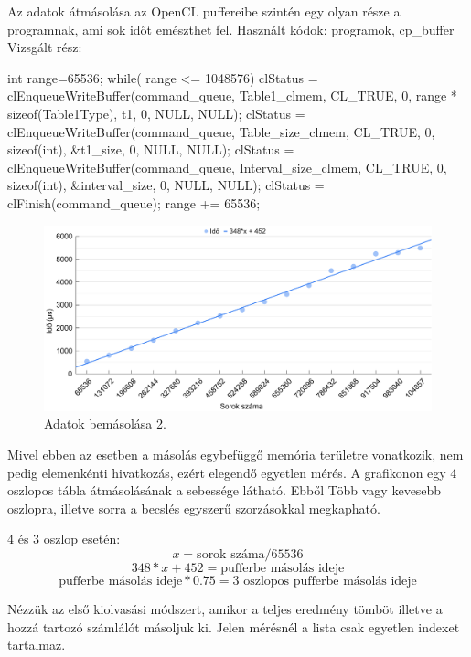 
Az adatok átmásolása az OpenCL puffereibe szintén egy olyan része a programnak, ami sok időt emészthet fel.
Használt kódok: programok, cp\_buffer
Vizsgált rész:

\begin{python}
int range=65536;
while( range <= 1048576){
 clStatus = clEnqueueWriteBuffer(command_queue, Table1_clmem,
  CL_TRUE, 0, range * sizeof(Table1Type), t1, 0, NULL, NULL);
 clStatus = clEnqueueWriteBuffer(command_queue, Table_size_clmem,
  CL_TRUE, 0, sizeof(int), &t1_size, 0, NULL, NULL);
 clStatus = clEnqueueWriteBuffer(command_queue, Interval_size_clmem,
  CL_TRUE, 0, sizeof(int), &interval_size, 0, NULL, NULL);
 clStatus = clFinish(command_queue);
	range += 65536;
}
\end{python}

\begin{figure}[h!]
\centering
\includegraphics[width=\textwidth]{images/graph/pufferin.png}
\caption{Adatok bemásolása 2.}
\label{fig:schema}
\end{figure}

Mivel ebben az esetben a másolás egybefüggő memória területre vonatkozik, nem pedig elemenkénti hivatkozás, ezért elegendő egyetlen mérés.
A grafikonon egy 4 oszlopos tábla átmásolásának a sebessége látható. Ebből Több vagy kevesebb oszlopra, illetve sorra a becslés egyszerű szorzásokkal megkapható.

4 és 3 oszlop esetén:
$$ x = \text{sorok száma} / 65536 $$
$$ 348*x + 452 = \text{pufferbe másolás ideje} $$ 
$$ \text{pufferbe másolás ideje} * 0.75 = \text{3 oszlopos pufferbe másolás ideje}  $$


Nézzük az első kiolvasási módszert, amikor a teljes eredmény tömböt illetve a hozzá tartozó számlálót másoljuk ki.
Jelen mérésnél a lista csak egyetlen indexet tartalmaz. 


